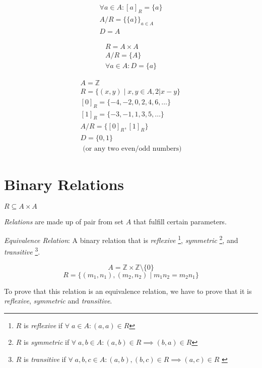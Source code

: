 \documentclass[00_complete]{subfiles}
\begin{document}
\begin{example}
$$
\begin{gathered}
    \forall a \in A: [a]_R = \{a\} \\
    A/R=\{\{a\}\}_{a \in A} \\
    D=A
\end{gathered}
$$
\end{example}
\begin{example}
$$
\begin{gathered}
    R = A \times A \\
    A/R = \{A\} \\
    \forall a \in A: D = \{a\}
\end{gathered}
$$
\end{example}
\begin{example}
$$
\begin{gathered}
    A  = \mathbb{Z} \\
    R = \{(x,y) \mid x,y \in A, 2 | x-y \} \\
    [0]_R = \{-4,-2,0,2,4,6,\ldots\} \\
    [1]_R = \{-3,-1,1,3,5,\ldots\} \\
    A/R = \{[0]_R, [1]_R \} \\
    D = \{0,1\} \\
    \text{ (or any two even/odd numbers)}
\end{gathered}
$$
\end{example}
\section{Binary Relations}

\begin{definition}
\(R \subseteq A \times A\)

\emph{Relations} are made up of pair from set \(A\) that fulfill certain
parameters.

\emph{Equivalence Relation}: A binary relation that is
\emph{reflexive}
\footnote{\(R\) is \emph{reflexive} if \(\forall \; a \in A: (a,a) \in
R\)\label{reflexive}},
\emph{symmetric}
\footnote{\(R\) is \emph{symmetric} if \(\forall \; a,b \in A: (a,b) \in R
\implies (b,a) \in R\)\label{symmetric}},
and \emph{transitive}
\footnote{\(R\) is \emph{transitive} if \(\forall \; a,b,c \in A: (a,b), (b,c)
\in R \implies (a,c) \in R\) \label{transitive}}.

\end{definition}
\begin{example}
\[A = \mathbb{Z} \times \mathbb{Z} \setminus \{0\}\]
\[R=\{(m_1,n_1),(m_2,n_2) \mid m_1n_2=m_2n_1\}\]
\end{example}

To prove that this relation is an equivalence relation, we have to prove
that it is \emph{reflexive}, \emph{symmetric} and \emph{transitive}.
\end{document}
